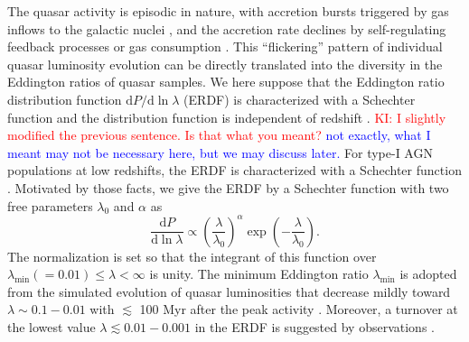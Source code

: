 \documentclass[twocolumn, twocolappendix]{aastex63}
\newcommand{\D}{\mathrm{d}}
\newcommand{\red}[1]{\textcolor{red}{ #1}}
\newcommand{\blue}[1]{\textcolor{blue}{ #1}}
\begin{document}
\begin{CJK*}{UTF8}{gbsn}
The quasar activity is episodic in nature, with accretion bursts triggered by gas inflows to the galactic nuclei
\citep{2005Natur.433..604D,2005ApJ...630..705H}, 
and the accretion rate declines by self-regulating feedback processes \citep[e.g.,][]{2008ApJ...686..815Y,2011ApJ...737...26N} 
or gas consumption \citep{1991MNRAS.248..754P,2005ApJ...634..901Y,2007MNRAS.377L..25K}. 
This ``flickering'' pattern of individual quasar luminosity evolution can be directly translated into the diversity 
in the Eddington ratios of quasar samples. 
We here suppose that the Eddington ratio distribution function $\D P/ \D\ln\lambda$ (ERDF) is characterized
with a Schechter function and the distribution function is independent of redshift 
\citep{2006ApJ...639..700H,2009ApJ...698.1550H}. \red{KI: I slightly modified the previous sentence. Is that what you meant?}
\blue{
  not exactly, what I meant may not be necessary here, but we may discuss later.
}
For type-I AGN populations at low redshifts, the ERDF is characterized with a Schechter function
\citep{2015MNRAS.447.2085S,2016ApJ...826...12J,2018MNRAS.474.1225A}.
Motivated by those facts, we give the ERDF by a Schechter function with two free parameters $\lambda_0$ and $\alpha$ as
\begin{equation}
  \label{eq:Pl}
  \frac{\D P}{ \D \ln \lambda} \propto
  \left(\frac{\lambda} {\lambda_0} \right)^\alpha \exp{\left(-\frac{\lambda}{\lambda_0}\right)}.
\end{equation}
The normalization is set so that the integrant of this function over $\lambda_\mathrm{min}(=0.01) \leq \lambda < \infty$ is unity.
The minimum Eddington ratio $\lambda_\mathrm{min}$ is adopted from the simulated evolution of quasar luminosities 
that decrease mildly toward $\lambda \sim 0.1-0.01$ with $\lesssim$ 100 Myr after the peak activity \citep{2011ApJ...737...26N}.
Moreover, a turnover at the lowest value $\lambda\lesssim 0.01-0.001$ in the ERDF is suggested by observations \citep{2018MNRAS.474.1225A}.  





\end{CJK*}
\end{document}
